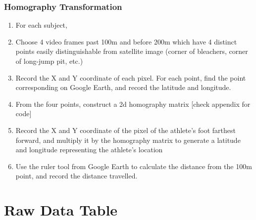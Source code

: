 \documentclass[index]{subfiles}
\begin{document}
\subsubsection*{Homography Transformation}

\begin{enumerate}
    \item For each subject,
    \item Choose 4 video frames past 100m and before 200m which have 4 distinct points easily distinguishable from satellite image (corner of bleachers, corner of long-jump pit, etc.)
    \item Record the X and Y coordinate of each pixel. For each point, find the point corresponding on Google Earth, and record the latitude and longitude.
    \item From the four points, construct a 2d homography matrix [check appendix for code]
    \item Record the X and Y coordinate of the pixel of the athlete's foot farthest forward, and multiply it by the homography matrix to generate a latitude and longitude representing the athlete's location
    \item Use the ruler tool from Google Earth to calculate the distance from the 100m point, and record the distance travelled.
\end{enumerate}

\section{Raw Data Table}
\end{document}
